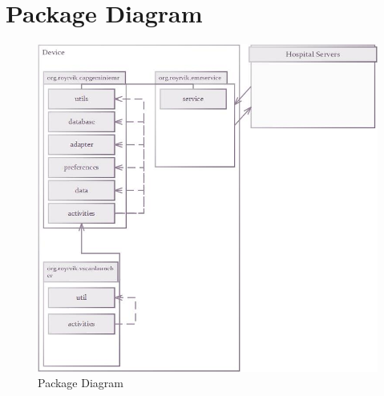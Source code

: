 \section{Package Diagram}
\label{classdiagram}

\begin{figure}[H]
\centering
\includegraphics[scale=0.7]{img/classdiagram.jpg}
\caption{Package Diagram}
\label{fig:packagediagram}
\end{figure}